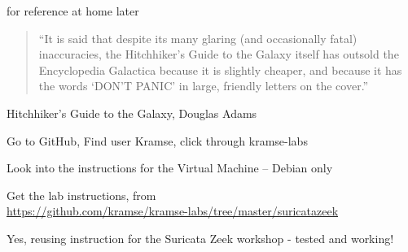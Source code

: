 \documentclass[Screen16to9,17pt]{foils}
\begin{document}
for reference at home later




\begin{quote}
“It is said that despite its many glaring (and occasionally fatal) inaccuracies, the Hitchhiker’s Guide to the Galaxy itself has outsold the Encyclopedia Galactica because it is slightly cheaper, and because it has the words ‘DON’T PANIC’ in large, friendly letters on the cover.”
\end{quote}
Hitchhiker’s Guide to the Galaxy, Douglas Adams


\begin{list2}
\item Go to GitHub, Find user Kramse, click through kramse-labs
\item Look into the instructions for the Virtual Machine -- Debian only

\item Get the lab instructions, from\\ {\footnotesize\url{https://github.com/kramse/kramse-labs/tree/master/suricatazeek}}
\end{list2}

Yes, reusing instruction for the Suricata Zeek workshop - tested and working!






\end{document}
